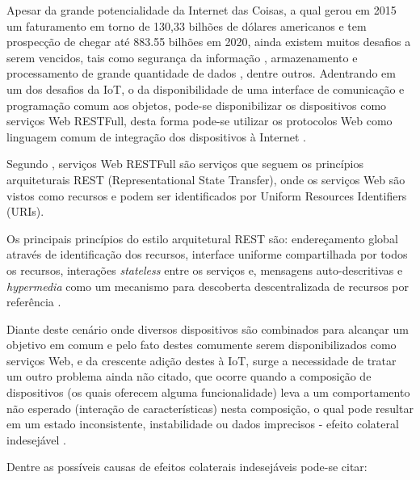 Apesar da grande potencialidade da Internet das Coisas, a qual gerou em 2015 um faturamento em torno de 130,33 bilhões de dólares americanos e tem prospecção de chegar até 883.55 bilhões em 2020\footnotemark {}, ainda existem muitos desafios a serem vencidos, tais como segurança da informação \cite{Roman:2013}, armazenamento e processamento de grande quantidade de dados \cite{Zaslavsky:2013}, dentre outros. Adentrando em um dos desafios da IoT, o da disponibilidade de uma interface de comunicação e programação comum aos objetos, pode-se disponibilizar os dispositivos como serviços Web RESTFull, desta forma pode-se utilizar os protocolos Web como linguagem comum de integração dos dispositivos à Internet \cite{Franca:2011, Roy:2015, Mineraud:2016}.

Segundo \cite{Heffelfinger:2014}, serviços Web RESTFull são serviços que seguem os princípios arquiteturais REST (Representational State Transfer), onde os serviços Web são vistos como recursos e podem ser identificados por Uniform Resources Identifiers (URIs). 

Os principais princípios do estilo arquitetural REST são: endereçamento global através de identificação dos recursos, interface uniforme compartilhada por todos os recursos, interações \textit{stateless} entre os serviços e, mensagens auto-descritivas e \textit{hypermedia} como um mecanismo para descoberta descentralizada de recursos por referência \cite{Pautasso:2014}.

Diante deste cenário onde diversos dispositivos são combinados para alcançar um objetivo em comum \cite{Kranz:2010, Atzori:2010, Whitmore:2015} e pelo fato destes comumente serem disponibilizados como serviços Web, e da crescente adição destes à IoT, surge a necessidade de tratar um outro problema ainda não citado, que ocorre quando a composição de dispositivos (os quais oferecem alguma funcionalidade) leva a um comportamento não esperado (interação de características) nesta composição, o qual pode resultar em um estado inconsistente, instabilidade ou dados imprecisos - efeito colateral indesejável \cite{NHLABATSI:2008}.

Dentre as possíveis causas \cite{Weiss:2007} de efeitos colaterais indesejáveis pode-se citar:

